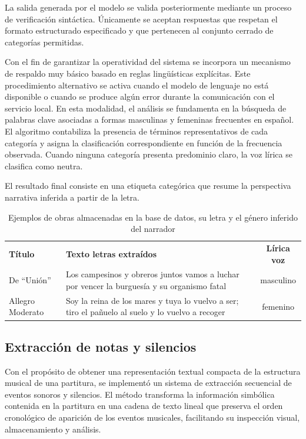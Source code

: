 La salida generada por el modelo se valida posteriormente mediante un proceso de verificación sintáctica. Únicamente se aceptan respuestas que respetan el formato estructurado especificado y que pertenecen al conjunto cerrado de categorías permitidas.

Con el fin de garantizar la operatividad del sistema se incorpora un mecanismo de respaldo muy básico basado en reglas lingüísticas explícitas. Este procedimiento alternativo se activa cuando el modelo de lenguaje no está disponible o cuando se produce algún error durante la comunicación con el servicio local. En esta modalidad, el análisis se fundamenta en la búsqueda de palabras clave asociadas a formas masculinas y femeninas frecuentes en español. El algoritmo contabiliza la presencia de términos representativos de cada categoría y asigna la clasificación correspondiente en función de la frecuencia observada. Cuando ninguna categoría presenta predominio claro, la voz lírica se clasifica como neutra.

El resultado final consiste en una etiqueta categórica que resume la perspectiva narrativa inferida a partir de la letra.

\begin{table}[H]
\centering
\begin{tabular}{l p{9cm} c}
\textbf{Título} & \textbf{Texto letras extraídos} & \textbf{Lírica voz} \\
De ``Unión'' & Los campesinos y obreros juntos vamos a luchar por vencer la burguesía y su organismo fatal & masculino \\
Allegro Moderato & Soy la reina de los mares y tuya lo vuelvo a ser; tiro el pañuelo al suelo y lo vuelvo a recoger & femenino \\
\end{tabular}
\caption{Ejemplos de obras almacenadas en la base de datos, su letra y el género inferido del narrador}
\end{table}

\subsection{Extracción de notas y silencios}
Con el propósito de obtener una representación textual compacta de la estructura musical de una partitura, se implementó un sistema de extracción secuencial de eventos sonoros y silencios. El método transforma la información simbólica contenida en la partitura en una cadena de texto lineal que preserva el orden cronológico de aparición de los eventos musicales, facilitando su inspección visual, almacenamiento y análisis.

